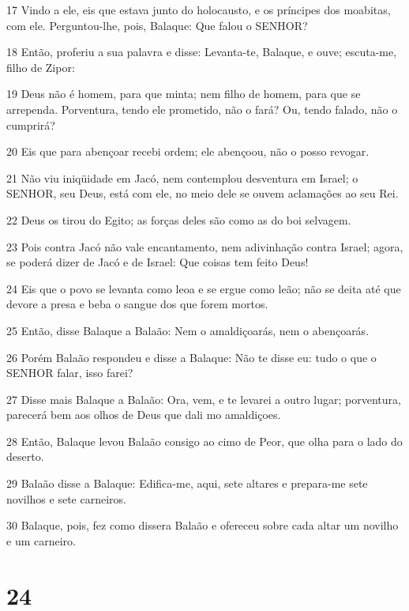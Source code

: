 \par 17 Vindo a ele, eis que estava junto do holocausto, e os príncipes dos moabitas, com ele. Perguntou-lhe, pois, Balaque: Que falou o SENHOR?
\par 18 Então, proferiu a sua palavra e disse: Levanta-te, Balaque, e ouve; escuta-me, filho de Zipor:
\par 19 Deus não é homem, para que minta; nem filho de homem, para que se arrependa. Porventura, tendo ele prometido, não o fará? Ou, tendo falado, não o cumprirá?
\par 20 Eis que para abençoar recebi ordem; ele abençoou, não o posso revogar.
\par 21 Não viu iniqüidade em Jacó, nem contemplou desventura em Israel; o SENHOR, seu Deus, está com ele, no meio dele se ouvem aclamações ao seu Rei.
\par 22 Deus os tirou do Egito; as forças deles são como as do boi selvagem.
\par 23 Pois contra Jacó não vale encantamento, nem adivinhação contra Israel; agora, se poderá dizer de Jacó e de Israel: Que coisas tem feito Deus!
\par 24 Eis que o povo se levanta como leoa e se ergue como leão; não se deita até que devore a presa e beba o sangue dos que forem mortos.
\par 25 Então, disse Balaque a Balaão: Nem o amaldiçoarás, nem o abençoarás.
\par 26 Porém Balaão respondeu e disse a Balaque: Não te disse eu: tudo o que o SENHOR falar, isso farei?
\par 27 Disse mais Balaque a Balaão: Ora, vem, e te levarei a outro lugar; porventura, parecerá bem aos olhos de Deus que dali mo amaldiçoes.
\par 28 Então, Balaque levou Balaão consigo ao cimo de Peor, que olha para o lado do deserto.
\par 29 Balaão disse a Balaque: Edifica-me, aqui, sete altares e prepara-me sete novilhos e sete carneiros.
\par 30 Balaque, pois, fez como dissera Balaão e ofereceu sobre cada altar um novilho e um carneiro.

\chapter{24}


